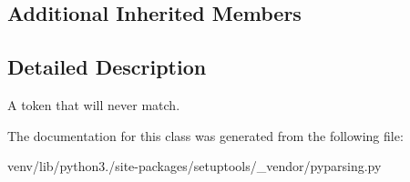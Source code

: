 \subsection*{Additional Inherited Members}


\subsection{Detailed Description}
\begin{DoxyVerb}A token that will never match.
\end{DoxyVerb}
 

The documentation for this class was generated from the following file\+:\begin{DoxyCompactItemize}
\item 
venv/lib/python3./site-\/packages/setuptools/\+\_\+vendor/pyparsing.\+py\end{DoxyCompactItemize}
